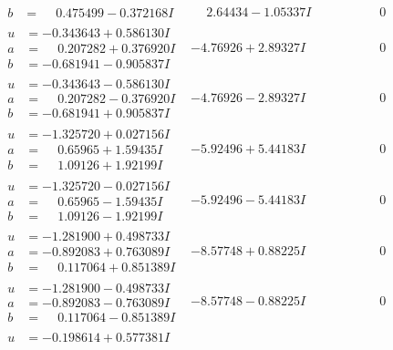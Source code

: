 \documentclass[1p]{elsarticle_modified}
\theoremstyle{definition}
\begin{document}
$$\begin{array}{c|c|c}
\begin{aligned}
b &= \phantom{-}0.475499 - 0.372168 I\end{aligned}
 & \phantom{-}2.64434 - 1.05337 I & \phantom{-0.000000 } 0 \\ \hline\begin{aligned}
u &= -0.343643 + 0.586130 I \\
a &= \phantom{-}0.207282 + 0.376920 I \\
b &= -0.681941 - 0.905837 I\end{aligned}
 & -4.76926 + 2.89327 I & \phantom{-0.000000 } 0 \\ \hline\begin{aligned}
u &= -0.343643 - 0.586130 I \\
a &= \phantom{-}0.207282 - 0.376920 I \\
b &= -0.681941 + 0.905837 I\end{aligned}
 & -4.76926 - 2.89327 I & \phantom{-0.000000 } 0 \\ \hline\begin{aligned}
u &= -1.325720 + 0.027156 I \\
a &= \phantom{-}0.65965 + 1.59435 I \\
b &= \phantom{-}1.09126 + 1.92199 I\end{aligned}
 & -5.92496 + 5.44183 I & \phantom{-0.000000 } 0 \\ \hline\begin{aligned}
u &= -1.325720 - 0.027156 I \\
a &= \phantom{-}0.65965 - 1.59435 I \\
b &= \phantom{-}1.09126 - 1.92199 I\end{aligned}
 & -5.92496 - 5.44183 I & \phantom{-0.000000 } 0 \\ \hline\begin{aligned}
u &= -1.281900 + 0.498733 I \\
a &= -0.892083 + 0.763089 I \\
b &= \phantom{-}0.117064 + 0.851389 I\end{aligned}
 & -8.57748 + 0.88225 I & \phantom{-0.000000 } 0 \\ \hline\begin{aligned}
u &= -1.281900 - 0.498733 I \\
a &= -0.892083 - 0.763089 I \\
b &= \phantom{-}0.117064 - 0.851389 I\end{aligned}
 & -8.57748 - 0.88225 I & \phantom{-0.000000 } 0 \\ \hline\begin{aligned}
u &= -0.198614 + 0.577381 I \\

\end{aligned}
\end{array}$$
\end{document}
